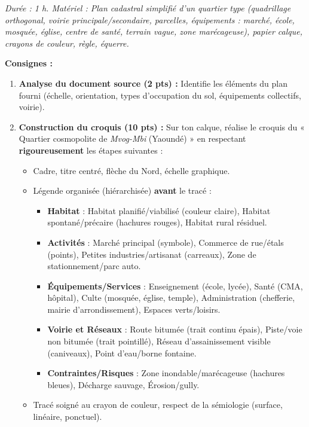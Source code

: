 \documentclass[11pt]{article}
\begin{document}
\begin{exercice}
\emph{Durée : 1 h. Matériel : Plan cadastral simplifié d'un quartier type (quadrillage orthogonal, voirie principale/secondaire, parcelles, équipements : marché, école, mosquée, église, centre de santé, terrain vague, zone marécageuse), papier calque, crayons de couleur, règle, équerre.}

\textbf{Consignes :}
\begin{enumerate}
    \item \textbf{Analyse du document source (2 pts) :} Identifie les éléments du plan fourni (échelle, orientation, types d'occupation du sol, équipements collectifs, voirie).
    \item \textbf{Construction du croquis (10 pts) :} Sur ton calque, réalise le croquis du « Quartier cosmopolite de \emph{Mvog-Mbi} (Yaoundé) » en respectant \textbf{rigoureusement} les étapes suivantes :
    \begin{itemize}
        \item Cadre, titre centré, flèche du Nord, échelle graphique.
        \item Légende organisée (hiérarchisée) \textbf{avant} le tracé : 
        \begin{itemize}
            \item \textbf{Habitat} : Habitat planifié/viabilisé (couleur claire), Habitat spontané/précaire (hachures rouges), Habitat rural résiduel.
            \item \textbf{Activités} : Marché principal (symbole), Commerce de rue/étals (points), Petites industries/artisanat (carreaux), Zone de stationnement/parc auto.
            \item \textbf{Équipements/Services} : Enseignement (école, lycée), Santé (CMA, hôpital), Culte (mosquée, église, temple), Administration (chefferie, mairie d'arrondissement), Espaces verts/loisirs.
            \item \textbf{Voirie et Réseaux} : Route bitumée (trait continu épais), Piste/voie non bitumée (trait pointillé), Réseau d'assainissement visible (caniveaux), Point d'eau/borne fontaine.
            \item \textbf{Contraintes/Risques} : Zone inondable/marécageuse (hachures bleues), Décharge sauvage, Érosion/gully.
        \end{itemize}
        \item Tracé soigné au crayon de couleur, respect de la sémiologie (surface, linéaire, ponctuel).

\end{itemize}
\end{enumerate}
\end{exercice}
\end{document}

